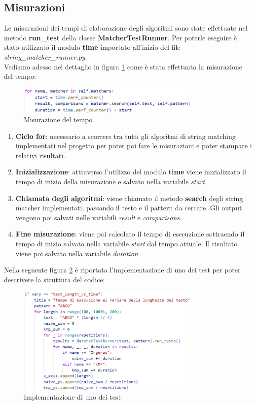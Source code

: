 \documentclass{article}
\begin{document}
\subsection{Misurazioni}
Le misurazioni dei tempi di elaborazione degli algoritmi sono state effettuate nel metodo \textbf{run\_test} della classe \textbf{MatcherTestRunner}. Per poterle eseguire è stato utilizzato il modulo \textbf{time} importato all'inizio del file \textit{string\_matcher\_runner.py}.\\
Vediamo adesso nel dettaglio in figura \ref{fig:time-measurement} come è stata effettuata la misurazione del tempo:
\begin{figure}[H]
    \centering
    \includegraphics[width=0.8\textwidth]{img/Tempo.png}
    \caption{Misurazione del tempo}
    \label{fig:time-measurement}
\end{figure}
\begin{enumerate}
    \item \textbf{Ciclo for}: necessario a scorrere tra tutti gli algoritmi di string matching implementati nel progetto per poter poi fare le misurazioni e poter stampare i relativi risultati.
    \item \textbf{Inizializzazione}: attraverso l'utilizzo del modulo \textbf{time} viene inizializzato il tempo di inizio della misurazione e salvato nella variabile \textit{start}.
    \item \textbf{Chiamata degli algoritmi}: viene chiamato il metodo \textbf{search} degli string matcher implementati, passando il testo e il pattern da cercare. Gli output vengono poi salvati nelle variabili \textit{result} e \textit{comparisons}.
    \item \textbf{Fine misurazione}: viene poi calcolato il tempo di esecuzione sottraendo il tempo di inizio salvato nella variabile \textit{start} dal tempo attuale. Il risultato viene poi salvato nella variabile \textit{duration}.
\end{enumerate}
Nella seguente figura \ref{fig:test-implementation} è riportata l'implementazione di uno dei test per poter descrivere la struttura del codice:
\begin{figure}[H]
    \centering
    \includegraphics[width=0.8\textwidth]{img/Test.png}
    \caption{Implementazione di uno dei test}
    \label{fig:test-implementation}
\end{figure}
\end{document}
